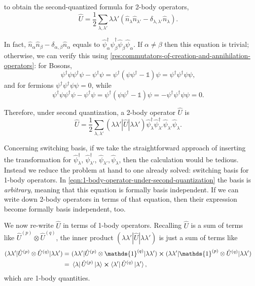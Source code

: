 \documentclass{article}
\theoremstyle{definition}
\numberwithin{equation}{section}
\begin{document}
to obtain the 
second-quantized formula for 2-body operators, 
\[
    \hat{U}
    =
    \frac{1}{2}
    \sum_{\lambda,\lambda'}
    \lambda \lambda'
    \left( \hat{n}_{\lambda}\hat{n}_{\lambda'}
    -
    \delta_{\lambda,\lambda'}
    \hat{n}_{\lambda} \right) .
\]

In fact, $\hat{n}_{\alpha}\hat{n}_{\beta}
    -
    \delta_{\alpha,\beta}
    \hat{n}_{\alpha}$ 
    equals to $\hat{\psi}^{\dagger}_{\alpha}\hat{\psi}^{\dagger}_{\beta}
    \hat{\psi}_{\beta}\hat{\psi}_{\alpha}$. 
If $\alpha \neq \beta$ then this equation is trivial; 
otherwise, we can verify this using 
\cref{res:commutators-of-creation-and-annihilation-operators}: 
for Bosons, 
\[
    \psi ^{\dagger} \psi \psi ^{\dagger} \psi
    -
    \psi ^{\dagger} \psi
    =
    \psi ^{\dagger} (\psi \psi ^{\dagger} -\mathds{1}) \psi
    = \psi ^{\dagger} \psi ^{\dagger} 
    \psi \psi,
\]
and for fermions $\psi ^{\dagger} \psi ^{\dagger} \psi \psi=0$, while
\[
    \psi ^{\dagger} \psi \psi ^{\dagger} \psi 
    -
    \psi ^{\dagger} \psi
    =
    \psi ^{\dagger} (\psi \psi ^{\dagger} -\mathds{1}) \psi
    =
    - \psi ^{\dagger} \psi ^{\dagger} \psi \psi =0.
\]

Therefore, under second quantization, 
a 2-body operator $\hat{U}$ is 
\begin{equation*}
    \hat{U}
    =
    \frac{1}{2}
    \sum_{\lambda,\lambda'}
    (\lambda \lambda'
    |\hat{U}|
    \lambda \lambda')
    \hat{\psi}^{\dagger}_{\lambda}
    \hat{\psi}^{\dagger}_{\lambda'}
    \hat{\psi}_{\lambda'}
    \hat{\psi}_{\lambda}.
\end{equation*}

Concerning switching basis, 
if we take the straightforward approach 
of inserting the 
transformation for $\hat{\psi}^{\dagger}_{\lambda}$, 
$\hat{\psi}^{\dagger}_{\lambda'}$, 
$\hat{\psi}_{\lambda'}, \hat{\psi}_{\lambda}$, then 
the calculation would be tedious. 
Instead we reduce the problem at hand 
to one already solved: switching basis 
for 1-body operators. 
In \cref{eqn:1-body-operator-under-second-quantization} 
the basis is \textit{arbitrary}, meaning that 
this equation is formally basis independent. 
If we can write down 2-body operators 
in terms of that equation, then 
their expression become formally basis independent, too.

We now 
re-write $\hat{U}$ 
in terms of 1-body operators. 
Recalling $\hat{U}$ is a sum of 
terms like $\hat{U}^{(p)}\otimes \hat{U}^{(q)}$, 
the inner product 
$
    (\lambda \lambda'
    |\hat{U}|
    \lambda \lambda')
$
is just a sum of terms like
\begin{align*}
    (\lambda \lambda' | \hat{U}^{(p)}\otimes \hat{U}^{(q)}
    |\lambda \lambda')
    =&\ 
    (\lambda \lambda' | \hat{U}^{(p)}\otimes \mathds{1}^{(q)}
    |\lambda \lambda')
    \cross 
    (\lambda \lambda' | \mathds{1}^{(p)}\otimes \hat{U}^{(q)}
    |\lambda \lambda')
    \\
    =&\ 
    \bra{\lambda} \hat{U}^{(p)} \ket{\lambda}
    \cross 
    \bra{\lambda'} \hat{U}^{(q)} \ket{\lambda'},
\end{align*}
which are 1-body quantities. 
\end{document}

